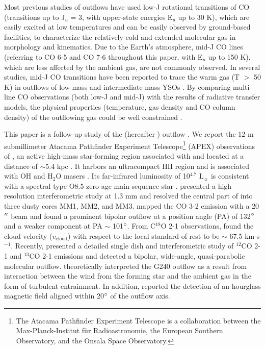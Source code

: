 Most previous studies of outflows have used low-J rotational transitions of CO (transitions up to J$_u$ = 3, with upper-state energies E$_u$ up to 30 K), which are easily excited at low temperatures and can be easily observed by ground-based facilities, to characterize the relatively cold and extended molecular gas in morphology and kinematics. Due to the Earth's atmosphere, mid-J CO lines (referring to CO 6-5 and CO 7-6 throughout this paper, with  E$_u$ up to 150 K), which are less affected by the ambient gas, are not commonly observed. In several studies, mid-J CO transitions have been reported to trace the warm gas (T $>$ 50 K) in outflows of low-mass and intermediate-mass YSOs \citep{2009A&A...501..633V, 2009A&A...507.1425V, 2012A&A...542A..86Y, 2016A&A...587A..17V}. By comparing multi-line CO observations (both low-J and mid-J) with the results of radiative transfer models, the physical properties (temperature, gas density and CO column density) of the outflowing gas could be well constrained \citep{2015A&A...581A...4L}. 

This paper is a follow-up study of the  (hereafter ) outflow \citep{2009ApJ...696...66Q}. We report the 12-m submillimeter Atacama Pathfinder Experiment Telescope\footnote{    The Atacama Pathfinder Experiment Telescope is a collaboration between the Max-Planck-Institut f{\"u}r Radioastronomie, the European Southern Observatory, and the Onsala Space Observatory.} (APEX) observations of , an active high-mass star-forming region associated with  and located at a distance of $\sim$5.4 kpc \citep{2014ApJ...790...99C, 2015PASJ...67...69S}. It harbors an ultracompact H{\scriptsize II} region and is associated with OH and H$_2$O masers \citep{1993AJ....105.1495H, 1997MNRAS.289..203C, 1998AJ....116.1897M, 1999ApJS..123..487M, 2003MNRAS.341..551C}. Its far-infrared luminosity of 10$^{4.7}$ L$_\sun$ is consistent with a spectral type O8.5 zero-age main-sequence star \citep{1998AJ....116.1897M}. \citet{2009ApJ...696...66Q} presented a high resolution interferometric study at 1.3 mm and resolved the central part of  into three dusty cores MM1, MM2, and MM3. \citet{2003A&A...412..175K} mapped the CO 3-2 emission with a 20${\mbox{$^{\prime\prime}$}}$ beam and found a prominent bipolar outflow at a position angle (PA) of 132${\mbox{$^\circ$}}$ and a weaker component at PA $\sim$ 101${\mbox{$^\circ$}}$. From C$^{18}$O 2-1 observations, \citet{2003A&A...412..175K} found the cloud velocity ($v_{\mathrm{cloud}}$) with respect to the local standard of rest to be $\sim$ 67.5 km s$^{-1}$. Recently, \citet{2009ApJ...696...66Q} presented a detailed single dish and interferometric study of $^{12}$CO 2-1 and $^{13}$CO 2-1 emissions and detected a bipolar, wide-angle, quasi-parabolic molecular outflow. \citet{2013A&A...559A..23L} theoretically interpreted the G240 outflow as a result from interaction between the wind from the forming star and the ambient gas in the form of turbulent entrainment. In addition, \citet{2014ApJ...794L..18Q} reported the detection of an hourglass magnetic field aligned within 20${\mbox{$^\circ$}}$ of the outflow axis.

